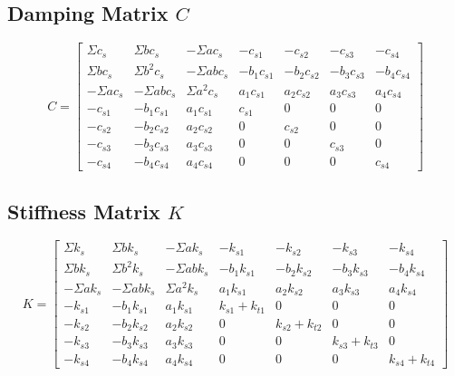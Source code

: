 \documentclass[11pt]{article}
\def\vect#1{#1}%
\newcommand{\vect}[1]{\bm{#1}}
\begin{document}
\subsection{Damping Matrix $\vect{C}$}

\begin{equation}
\boxed{
\vect{C} = \begin{bmatrix}
\Sigma c_s & \Sigma b c_s & -\Sigma a c_s & -c_{s1} & -c_{s2} & -c_{s3} & -c_{s4} \\
\Sigma b c_s & \Sigma b^2 c_s & -\Sigma ab c_s & -b_1 c_{s1} & -b_2 c_{s2} & -b_3 c_{s3} & -b_4 c_{s4} \\
-\Sigma a c_s & -\Sigma ab c_s & \Sigma a^2 c_s & a_1 c_{s1} & a_2 c_{s2} & a_3 c_{s3} & a_4 c_{s4} \\
-c_{s1} & -b_1 c_{s1} & a_1 c_{s1} & c_{s1} & 0 & 0 & 0 \\
-c_{s2} & -b_2 c_{s2} & a_2 c_{s2} & 0 & c_{s2} & 0 & 0 \\
-c_{s3} & -b_3 c_{s3} & a_3 c_{s3} & 0 & 0 & c_{s3} & 0 \\
-c_{s4} & -b_4 c_{s4} & a_4 c_{s4} & 0 & 0 & 0 & c_{s4}
\end{bmatrix}
}
\label{eq:C}
\end{equation}

\subsection{Stiffness Matrix $\vect{K}$}

\begin{equation}
\boxed{
\vect{K} = \begin{bmatrix}
\Sigma k_s & \Sigma b k_s & -\Sigma a k_s & -k_{s1} & -k_{s2} & -k_{s3} & -k_{s4} \\
\Sigma b k_s & \Sigma b^2 k_s & -\Sigma ab k_s & -b_1 k_{s1} & -b_2 k_{s2} & -b_3 k_{s3} & -b_4 k_{s4} \\
-\Sigma a k_s & -\Sigma ab k_s & \Sigma a^2 k_s & a_1 k_{s1} & a_2 k_{s2} & a_3 k_{s3} & a_4 k_{s4} \\
-k_{s1} & -b_1 k_{s1} & a_1 k_{s1} & k_{s1}+k_{t1} & 0 & 0 & 0 \\
-k_{s2} & -b_2 k_{s2} & a_2 k_{s2} & 0 & k_{s2}+k_{t2} & 0 & 0 \\
-k_{s3} & -b_3 k_{s3} & a_3 k_{s3} & 0 & 0 & k_{s3}+k_{t3} & 0 \\
-k_{s4} & -b_4 k_{s4} & a_4 k_{s4} & 0 & 0 & 0 & k_{s4}+k_{t4}
\end{bmatrix}
}
\label{eq:K}
\end{equation}
\end{document}

